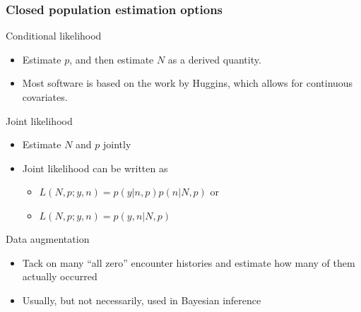 \documentclass[color=usenames,dvipsnames]{beamer}\usepackage[]{graphicx}\usepackage[]{color}
\begin{document}
\begin{frame}
  \frametitle{Closed population estimation options}
  Conditional likelihood \\
  \begin{itemize}
    \item Estimate $p$, and then estimate $N$ as a derived
      quantity. %
    \item Most software is based on the work by Huggins, which allows
      for continuous covariates. 
  \end{itemize}
  \pause
  \vfill
  Joint likelihood \\
  \begin{itemize}
    \item Estimate $N$ and $p$ jointly
    \item Joint likelihood can be written as
      \begin{itemize}
      \item $L(N,p;y,n) = p(y|n,p)p(n|N,p)$ or
      \item $L(N,p;y,n) = p(y,n|N,p)$
      \end{itemize}
  \end{itemize}
  \pause \vfill
  Data augmentation \\
  \begin{itemize}
    \item Tack on many ``all zero'' encounter histories and estimate
      how many of them actually occurred
    \item Usually, but not necessarily, used in Bayesian inference
  \end{itemize}
\end{frame}
\end{document}
